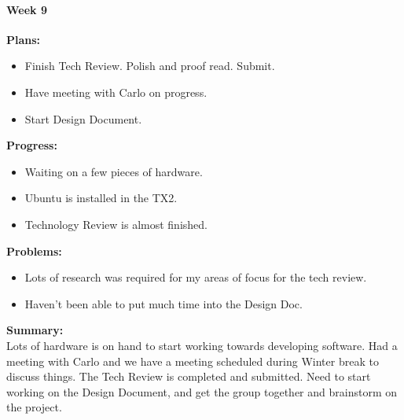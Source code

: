 \paragraph{Week 9}
\begin{adjustwidth}{2.5em}{0pt}
    \vspace{-0.5cm}\textbf{Plans:}
    \vspace{-0.5cm}
    \begin{itemize}
        \item Finish Tech Review. Polish and proof read. Submit.
		\item Have meeting with Carlo on progress.
		\item Start Design Document.
    \end{itemize} 
    \vspace{-0.3cm}\textbf{Progress:}
    \vspace{-0.5cm}
    \begin{itemize}
        \item Waiting on a few pieces of hardware.
		\item Ubuntu is installed in the TX2.
		\item Technology Review is almost finished.
    \end{itemize} 
    \vspace{-0.3cm}\textbf{Problems:}
    \vspace{-0.5cm}
    \begin{itemize}
        \item Lots of research was required for my areas of focus for the tech review.
		\item Haven't been able to put much time into the Design Doc.
    \end{itemize}  
    \vspace{-0.3cm}\noindent\textbf{Summary:}\\
    \noindent Lots of hardware is on hand to start working towards developing software. Had a meeting with Carlo and we have a meeting scheduled during Winter break to discuss things. The Tech Review is completed and submitted. Need to start working on the Design Document, and get the group together and brainstorm on the project. 
\end{adjustwidth} 

